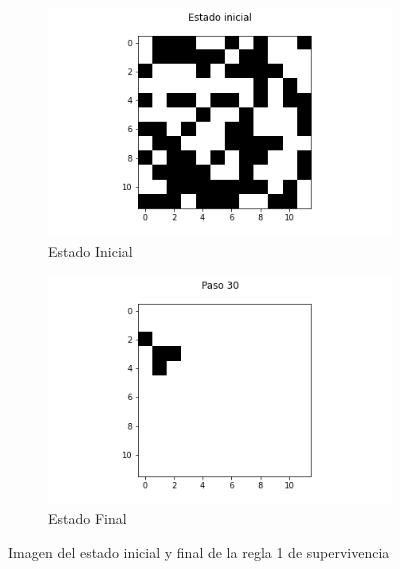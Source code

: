 \documentclass{article}
\begin{document}
\begin{figure}[h!]
\centering
\begin{subfigure}[b]{0.45\linewidth}
\includegraphics[width=\linewidth]{p2_r1_t00_p.png}
\caption{Estado Inicial}
\end{subfigure}
\begin{subfigure}[b]{0.45\linewidth}
\includegraphics[width=\linewidth]{p2_r1_t30_p.png}
\caption{Estado Final}
\end{subfigure}
\caption{Imagen del estado inicial y final de la regla 1 de supervivencia}
\label{fig:westminster}
\end{figure}
\end{document}
